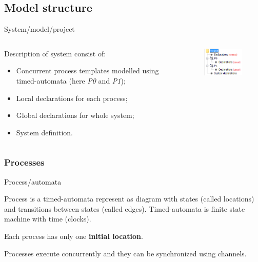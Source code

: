 \documentclass{beamer}
\begin{document}
\subsection{Model structure}
\begin{frame}{System/model/project}
	
	\begin{columns}
		\begin{column}{0.7\textwidth}
			Description of system consist of:	
			\begin{itemize}
				\item Concurrent process templates modelled using timed-automata (here \textit{P0} and \textit{P1});
				\item Local declarations for each process;
				\item Global declarations for whole system;
				\item System definition.
			\end{itemize}
		\end{column}
		
		\begin{column}{0.37\textwidth}
			\begin{figure}[H]
				\includegraphics[scale=1]{img/uppaal_project.png}
			\end{figure}
		\end{column}
	\end{columns}
\end{frame}

\subsubsection{Processes}

\begin{frame}{Process/automata}
	
	Process is a timed-automata represent as diagram with states
	(called locations) and transitions between states (called edges). Timed-automata is finite state machine with time (clocks).\newline

	Each process has only one \textbf{initial location}.\newline
	
	Processes execute concurrently and they can be synchronized using channels.\newline
\end{frame}
\end{document}
